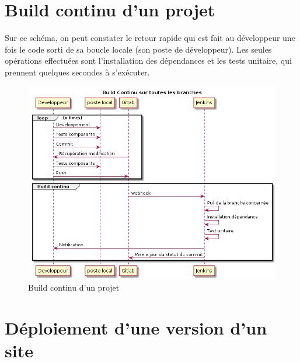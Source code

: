 \section{Build continu d'un projet \naq}\label{annexe:build-continu}

Sur ce schéma, on peut constater le retour rapide qui est fait au développeur une fois le code sorti de sa boucle locale (son poste de développeur). Les seules opérations effectuées sont l'installation des dépendances et les tests unitaire, qui prennent quelques secondes à s'exécuter.

\begin{figure}[ht]
	\centering
	\includegraphics[scale=0.6,angle=-90]{img/build-continu.png}
	\caption{Build continu d'un projet \naq}
	\label{annexe:build-continuImage}
\end{figure}

\clearpage
\section{Déploiement d'une version d'un site \naq}\label{annexe:release-naq}

